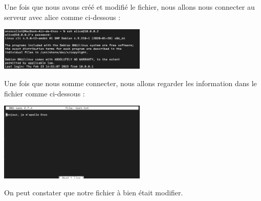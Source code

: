 \documentclass[12pt]{article}
\begin{document}
\vspace{0.3cm}

Une fois que nous avons créé et modifié le fichier, nous allons nous connecter au serveur avec alice comme ci-dessous : 

\vspace{0.3cm}

\begin{center}
  \includegraphics[width=7cm]{Image-TD-SSH-4/connexion-ssh.png}
\end{center}

\vspace{0.3cm}

Une fois que nous somme connecter, nous allons regarder les information dans le fichier comme ci-dessous  : 


\vspace{0.3cm}

\begin{center}
  \includegraphics[width=7cm]{Image-TD-SSH-4/verfication-fichier.png}
\end{center}

\vspace{0.3cm}

On peut constater que notre fichier à bien était modifier.
\end{document}
